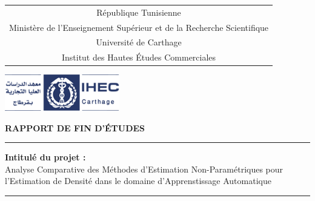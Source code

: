 \documentclass[a4paper, 12pt]{report}
\begin{document}
\begin{center}


\begin{tabular}{c}
\small
République Tunisienne\\
Ministère de l’Enseignement Supérieur et de la Recherche Scientifique \\
\vspace{0.2cm}
\small
Université de Carthage \\
\vspace{0.1cm}
\small
Institut des Hautes Études Commerciales
\end{tabular}


\vspace{0.4cm}
\includegraphics[width=5cm]{logo.png} %

\vspace{0.8cm}



\vspace{0.5cm}
{\Large{\textbf{RAPPORT DE FIN D'\'ETUDES }}}
\vspace{-0.4cm}
\vspace{-0.4cm}
\vspace{1cm}
\hrule height 1pt
\vspace{0.5cm}
{\large{\textbf{Intitulé du projet : }\\Analyse Comparative des Méthodes d'Estimation Non-Paramétriques pour l'Estimation de Densité dans le domaine d'Apprenstissage Automatique
}} %
\vspace{0.7cm}
\\ \par
\hrule height 3pt
\par
\vspace{0.8cm}
\vspace{-0.2cm}
\vspace{0.4cm}

\vspace{-1cm}

\begin{table} [H]
\center
\renewcommand{\footnoterule}{}
\renewcommand{\arraystretch}{1}
\setlength\tabcolsep{5pt}
\begin{tabular}{ll}




\end{tabular}
\end{table}
\end{center}
\end{document}
